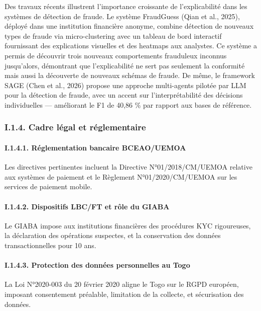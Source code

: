 \documentclass[
  12pt,
]{article}
\begin{document}
Des travaux récents illustrent l’importance croissante de
l’explicabilité dans les systèmes de détection de fraude. Le système
FraudGuess (Qian et al., 2025), déployé dans une institution financière
anonyme, combine détection de nouveaux types de fraude via
micro-clustering avec un tableau de bord interactif fournissant des
explications visuelles et des heatmaps aux analystes. Ce système a
permis de découvrir trois nouveaux comportements frauduleux inconnus
jusqu’alors, démontrant que l’explicabilité ne sert pas seulement la
conformité mais aussi la découverte de nouveaux schémas de fraude. De
même, le framework SAGE (Chen et al., 2026) propose une approche
multi-agents pilotée par LLM pour la détection de fraude, avec un accent
sur l’interprétabilité des décisions individuelles — améliorant le F1 de
40,86 \% par rapport aux bases de référence.

\subsubsection{I.1.4. Cadre légal et
réglementaire}\label{i.1.4.-cadre-luxe9gal-et-ruxe9glementaire}

\paragraph{I.1.4.1. Réglementation bancaire
BCEAO/UEMOA}\label{i.1.4.1.-ruxe9glementation-bancaire-bceaouemoa}

Les directives pertinentes incluent la Directive N°01/2018/CM/UEMOA
relative aux systèmes de paiement et le Règlement N°01/2020/CM/UEMOA sur
les services de paiement mobile.

\paragraph{I.1.4.2. Dispositifs LBC/FT et rôle du
GIABA}\label{i.1.4.2.-dispositifs-lbcft-et-ruxf4le-du-giaba}

Le GIABA impose aux institutions financières des procédures KYC
rigoureuses, la déclaration des opérations suspectes, et la conservation
des données transactionnelles pour 10 ans.

\paragraph{I.1.4.3. Protection des données personnelles au
Togo}\label{i.1.4.3.-protection-des-donnuxe9es-personnelles-au-togo}

La Loi N°2020-003 du 20 février 2020 aligne le Togo sur le RGPD
européen, imposant consentement préalable, limitation de la collecte, et
sécurisation des données.
\end{document}
